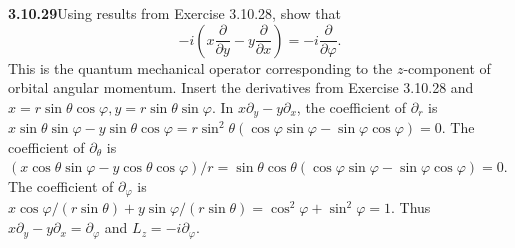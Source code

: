 \par\bigskip
\noindent\textbf{3.10.29}\quad Using results from Exercise 3.10.28, show that
\[
-i\left(x\frac{\partial}{\partial y}-y\frac{\partial}{\partial x}\right)
=-i\frac{\partial}{\partial\varphi}.
\]
This is the quantum mechanical operator corresponding to the $z$-component of
orbital angular momentum.
\solution
Insert the derivatives from Exercise 3.10.28 and
$x=r\sin\theta\cos\varphi,y=r\sin\theta\sin\varphi$.
In $x\partial_y-y\partial_x$, the coefficient of $\partial_r$ is
$x\sin\theta\sin\varphi-y\sin\theta\cos\varphi
=r\sin^2\theta(\cos\varphi\sin\varphi-\sin\varphi\cos\varphi)=0$.
The coefficient of $\partial_\theta$ is
$(x\cos\theta\sin\varphi-y\cos\theta\cos\varphi)/r
=\sin\theta\cos\theta(\cos\varphi\sin\varphi-\sin\varphi\cos\varphi)=0$.
The coefficient of $\partial_\varphi$ is
$x\cos\varphi/(r\sin\theta)+y\sin\varphi/(r\sin\theta)
=\cos^2\varphi+\sin^2\varphi=1$. Thus
$x\partial_y-y\partial_x=\partial_\varphi$ and
$\boxed{L_z=-i\partial_\varphi}$.

